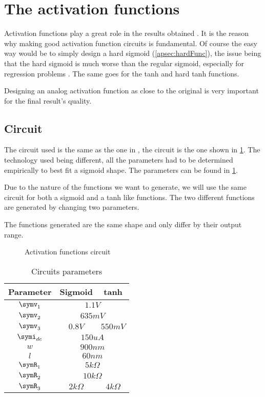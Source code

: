 \section{The activation functions}
\label{sec:af}

Activation functions play a great role in the results obtained \cite{af}. It is the reason why making good activation function circuits is fundamental. Of course the easy way would be to simply design a hard sigmoid (\cref{apsec:hardFunc}), the issue being that the hard sigmoid is much worse than the regular sigmoid, especially for regression problems \cite{hardSigm}. The same goes for the \ac{tanh} and hard \ac{tanh} functions.

Designing an analog activation function as close to the original is very important for the final result's quality.

\subsection{Circuit}

The circuit used is the same as the one in \cite{thesisRef}, the circuit is the one shown in \cref{circt:af}. The technology used being different, all the parameters had to be determined empirically to best fit a sigmoid shape. The parameters can be found in \cref{tab:afPar}.

Due to the nature of the functions we want to generate, we will use the same circuit for both a sigmoid and a \ac{tanh} like functions. The two different functions are generated by changing two parameters.

The functions generated are the same shape and only differ by their output range.

\begin{figure}[H]
  \centering
  
  \caption{Activation functions circuit}
  \label{circt:af}
\end{figure}

\begin{table}[H]
  \centering
  \begin{tabular}{|c|c|c|}
    \hline
    \rowcolor{gray}
    Parameter & Sigmoid & \ac{tanh} \\
    \hline
    $\symv_1$ & \multicolumn{2}{c|}{$1.1V$}\\
    \hline
    $\symv_2$ & \multicolumn{2}{c|}{$635mV$}\\
    \hline
    $\symv_3$ & $0.8V$ & $550mV$\\
    \hline
    $\symi_{dc}$ & \multicolumn{2}{c|}{$150uA$}\\
    \hline
    $w$ & \multicolumn{2}{c|}{$900nm$}\\
    \hline
    $l$ & \multicolumn{2}{c|}{$60nm$}\\
    \hline
    $\symR_1$ & \multicolumn{2}{c|}{$5k\Omega$}\\
    \hline
    $\symR_2$ & \multicolumn{2}{c|}{$10k\Omega$}\\
    \hline
    $\symR_3$ & $2k\Omega$ & $4k\Omega$\\
    \hline
  \end{tabular}
  \caption{Circuits parameters}
  \label{tab:afPar}
\end{table}

